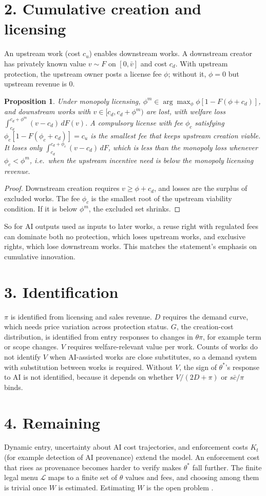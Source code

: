 \documentclass[11pt]{article}
\newtheorem{proposition}[theorem]{Proposition}
\theoremstyle{definition}
\begin{document}
\section*{2. Cumulative creation and licensing}
An upstream work (cost $c_u$) enables downstream works. A downstream creator has privately known value $v\sim F$ on
$[0,\bar v]$ and cost $c_d$. With upstream protection, the upstream owner posts a license fee $\phi$; without it,
$\phi=0$ but upstream revenue is $0$.
\begin{proposition}\label{prop:lic}
Under monopoly licensing, $\phi^m\in\arg\max_\phi\phi[1-F(\phi+c_d)]$, and downstream works with
$v\in[c_d,c_d+\phi^m)$ are lost, with welfare loss $\int_{c_d}^{c_d+\phi^m}(v-c_d)\,dF(v)$. A compulsory license with fee
$\phi_c$ satisfying $\phi_c[1-F(\phi_c+c_d)]=c_u$ is the smallest fee that keeps upstream creation viable. It loses only
$\int_{c_d}^{c_d+\phi_c}(v-c_d)\,dF$, which is less than the monopoly loss whenever $\phi_c<\phi^m$, i.e.\ when the upstream
incentive need is below the monopoly licensing revenue.
\end{proposition}
\begin{proof}
Downstream creation requires $v\ge\phi+c_d$, and losses are the surplus of excluded works. The fee $\phi_c$ is the smallest
root of the upstream viability condition. If it is below $\phi^m$, the excluded set shrinks.
\end{proof}
So for AI outputs used as inputs to later works, a reuse right with regulated fees can dominate both no protection, which loses
upstream works, and exclusive rights, which lose downstream works. This matches the statement's emphasis on cumulative
innovation.

\section*{3. Identification}
$\pi$ is identified from licensing and sales revenue. $D$ requires the demand curve, which needs price variation across
protection status. $G$, the creation-cost distribution, is identified from entry responses to changes in $\theta\pi$, for
example term or scope changes. $V$ requires welfare-relevant value per work. Counts of works do not identify $V$ when
AI-assisted works are close substitutes, so a demand system with substitution between works is required. Without $V$, the
sign of $\theta^*$'s response to AI is not identified, because it depends on whether $V/(2D+\pi)$ or $s\bar c/\pi$ binds.

\section*{4. Remaining}
Dynamic entry, uncertainty about AI cost trajectories, and enforcement costs $K_t$ (for example detection of AI provenance)
extend the model. An enforcement cost that rises as provenance becomes harder to verify makes $\theta^*$ fall further. The
finite legal menu $\mathcal L$ maps to a finite set of $\theta$ values and fees, and choosing among them is trivial once
$W$ is estimated. Estimating $W$ is the open problem \cite{nber}.
\end{document}
